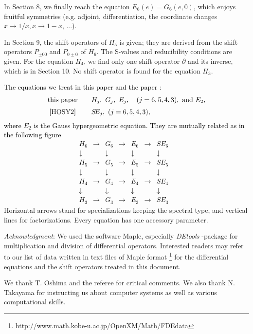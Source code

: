 \documentclass[a4paper,12pt]{article}
\theoremstyle{definition}
\theoremstyle{remark}
\numberwithin{equation}{section} %
\newcommand{\red}[1]{\textcolor{black}{#1}}
\begin{document}
\par\smallskip 
In Section 8, we finally reach the equation $E_6(e)=G_6(e,0)$, which enjoys fruitful symmetries (e.g. adjoint, differentiation, the coordinate changes $x\to1/x, x\to1-x$, ...).

\par\smallskip
In Section 9, the shift operators of $H_5$ is given; they are derived from the shift operators $P_{\pm00}$ and $P_{0\pm0}$ of $H_6$. The S-values and reducibility conditions are given.  For the equation $H_4$, we find only one shift operator $\partial$ and its inverse, which is in Section 10. No shift operator is found for the equation $H_3$. 
\par\medskip
\red{The equations we treat in this paper and the paper \cite{HOSY2}:
$$\begin{array}{cl}
{\rm this\ paper}&\quad H_j,\ G_j,\ E_j,\quad (j=6,5,4,3),\ {\rm and}\ E_2,\\[2mm]
{\rm  \cite{HOSY2}}&\quad S\!E_j, \ (j=6,5,4,3),
  \end{array}$$
where $E_2$ is the Gauss hypergeometric equation.
They are mutually related as in the following figure 
$$\begin{array}{cccccccc}
 H_6&\longrightarrow &G_6&\longrightarrow&E_6&\longrightarrow& S\!E_6&\\
\downarrow&&\downarrow&&\downarrow&&\downarrow \\
 H_5&\longrightarrow &G_5&\longrightarrow&E_5&\longrightarrow& S\!E_5&\\
\downarrow&&\downarrow&&\downarrow&&\downarrow \\
 H_4&\longrightarrow &G_4&\longrightarrow&E_4&\longrightarrow& S\!E_4&\\
\downarrow&&\downarrow&&\downarrow&&\downarrow \\
 H_3&\longrightarrow &G_3&\longrightarrow&E_3&\longrightarrow& S\!E_3&
  \end{array}$$
}
  Horizontal arrows stand for specializations keeping the spectral type,
      and vertical lines for factorizations. Every equation 
      has one accessory parameter. 


\par\medskip
{\it Acknowledgment}: We used the software Maple, especially {\sl DEtools \!}-package for multiplication and division of differential operators.  Interested readers may refer to our list of data written in text files of Maple format
\footnote{ http://www.math.kobe-u.ac.jp/OpenXM/Math/FDEdata}
for the differential equations and the shift operators treated in this document.
\par\smallskip\noindent
We thank T. Oshima and the referee for critical comments.
We also thank N. Takayama for instructing us about computer systems as well as various computational skills.
\end{document}
